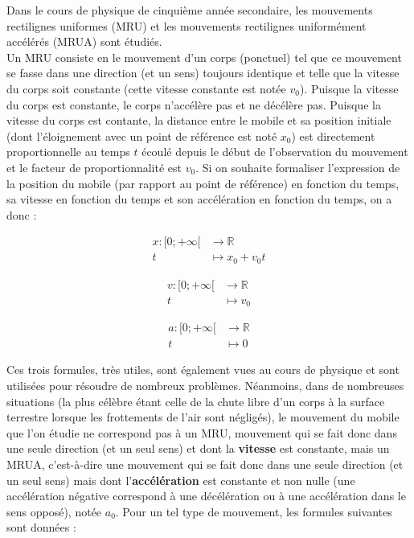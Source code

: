 \documentclass[a4paper,fontsize=13pt]{scrreprt}
\theoremstyle{plain}
\theoremstyle{definition}
\newcommand{\rr}{\mathbb{R}}
\begin{document}
Dans le cours de physique de cinquième année secondaire, les mouvements rectilignes uniformes (MRU) et les mouvements rectilignes uniformément accélérés (MRUA) sont étudiés. \\
Un MRU consiste en le mouvement d'un corps (ponctuel) tel que ce mouvement se fasse dans une direction (et un sens) toujours identique et telle que la vitesse du corps soit constante (cette vitesse constante est notée $v_0$). Puisque la vitesse du corps est constante, le corps n'accélère pas et ne décélère pas. Puisque la vitesse du corps est contante, la distance entre le mobile et sa position initiale (dont l'éloignement avec un point de référence est noté $x_0$) est directement proportionnelle au temps $t$ écoulé depuis le début de l'observation du mouvement et le facteur de proportionnalité est $v_0$. Si on souhaite formaliser l'expression de la position du mobile (par rapport au point de référence) en fonction du temps, sa vitesse en fonction du temps et son accélération en fonction du temps, on a donc :
\begin{itemize}
	\begin{multicols}{3}
		\item [~] \begin{align*}
		x : [0;+\infty[ &\to \rr \\
		t &\mapsto x_0 + v_0 t
		\end{align*}
		\item [~] \begin{align*}
		v : [0;+\infty[ &\to \rr \\
		t &\mapsto v_0
		\end{align*}
		\item [~] \begin{align*}
		a : [0;+\infty[ &\to \rr \\
		t &\mapsto 0
		\end{align*}
	\end{multicols}
\end{itemize}
Ces trois formules, très utiles, sont également vues au cours de physique et sont utilisées pour résoudre de nombreux problèmes. Néanmoins, dans de nombreuses situations (la plus célèbre étant celle de la chute libre d'un corps à la surface terrestre lorsque les frottements de l'air sont négligés), le mouvement du mobile que l'on étudie ne correspond pas à un MRU, mouvement qui se fait donc dans une seule direction (et un seul sens) et dont la \textbf{vitesse} est constante, mais un MRUA, c'est-à-dire une mouvement qui se fait donc dans une seule direction (et un seul sens) mais dont l'\textbf{accélération} est constante et non nulle (une accélération négative correspond à une décélération ou à une accélération dans le sens opposé), notée $a_0$. Pour un tel type de mouvement, les formules suivantes sont données :
\end{document}
